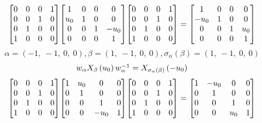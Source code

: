 \documentclass[11pt]{article}
\theoremstyle{definition}
\begin{document}
\[
\scaletoalign{\textwidth}{{\left[\begin{matrix}0 & 0 & 0 & 1\\0 & 0 & 1 & 0\\0 & 1 & 0 & 0\\1 & 0 & 0 & 0\end{matrix}\right]} {\left[\begin{matrix}1 & 0 & 0 & 0\\u_{0} & 1 & 0 & 0\\0 & 0 & 1 & - u_{0}\\0 & 0 & 0 & 1\end{matrix}\right]} {\left[\begin{matrix}0 & 0 & 0 & 1\\0 & 0 & 1 & 0\\0 & 1 & 0 & 0\\1 & 0 & 0 & 0\end{matrix}\right]} = {\left[\begin{matrix}1 & 0 & 0 & 0\\- u_{0} & 1 & 0 & 0\\0 & 0 & 1 & u_{0}\\0 & 0 & 0 & 1\end{matrix}\right]}}
\]
\[
\alpha = \left( -1, \  -1, \  0, \  0\right), \beta = \left( 1, \  -1, \  0, \  0\right), \sigma_{\alpha}(\beta) = \left( 1, \  -1, \  0, \  0\right)
\]
\[
\scaletoalign{\textwidth}{w_{\alpha} X_{\beta}\left(u_{0}\right) w_{\alpha}^{-1} = X_{\sigma_{\alpha}\left(\beta\right)}\left(- u_{0}\right)}
\]
\[
\scaletoalign{\textwidth}{{\left[\begin{matrix}0 & 0 & 0 & 1\\0 & 0 & 1 & 0\\0 & 1 & 0 & 0\\1 & 0 & 0 & 0\end{matrix}\right]} {\left[\begin{matrix}1 & u_{0} & 0 & 0\\0 & 1 & 0 & 0\\0 & 0 & 1 & 0\\0 & 0 & - u_{0} & 1\end{matrix}\right]} {\left[\begin{matrix}0 & 0 & 0 & 1\\0 & 0 & 1 & 0\\0 & 1 & 0 & 0\\1 & 0 & 0 & 0\end{matrix}\right]} = {\left[\begin{matrix}1 & - u_{0} & 0 & 0\\0 & 1 & 0 & 0\\0 & 0 & 1 & 0\\0 & 0 & u_{0} & 1\end{matrix}\right]}}
\]
\end{document}
